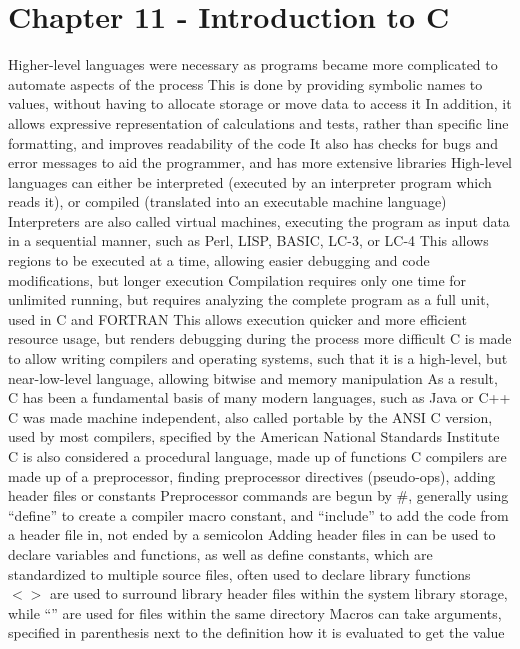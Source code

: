 \documentclass[11 pt, twoside]{article}
\newenvironment{outline*}
{
	\begin{outline}[enumerate]
	}
	{\end{outline}
}
\begin{document}
\section{Chapter 11 - Introduction to C}
\begin{outline*}
\1 Higher-level languages were necessary as programs became more complicated to automate aspects of the process
\2 This is done by providing symbolic names to values, without having to allocate storage or move data to access it
\2 In addition, it allows expressive representation of calculations and tests, rather than specific line formatting, and improves readability of the code
\2 It also has checks for bugs and error messages to aid the programmer, and has more extensive libraries
\1 High-level languages can either be interpreted (executed by an interpreter program which reads it), or compiled (translated into an executable machine language)
\2 Interpreters are also called virtual machines, executing the program as input data in a sequential manner, such as Perl, LISP, BASIC, LC-3, or LC-4
\3 This allows regions to be executed at a time, allowing easier debugging and code modifications, but longer execution
\2 Compilation requires only one time for unlimited running, but requires analyzing the complete program as a full unit, used in C and FORTRAN
\3 This allows execution quicker and more efficient resource usage, but renders debugging during the process more difficult
\1 C is made to allow writing compilers and operating systems, such that it is a high-level, but near-low-level language, allowing bitwise and memory manipulation
\2 As a result, C has been a fundamental basis of many modern languages, such as Java or C++
\2 C was made machine independent, also called portable by the ANSI C version, used by most compilers, specified by the American National Standards Institute
\2 C is also considered a procedural language, made up of functions
\1 C compilers are made up of a preprocessor, finding preprocessor directives (pseudo-ops), adding header files or constants
\2 Preprocessor commands are begun by \#, generally using ``define'' to create a compiler macro constant, and ``include'' to add the code from a header file in, not ended by a semicolon
\3 Adding header files in can be used to declare variables and functions, as well as define constants, which are standardized to multiple source files, often used to declare library functions
\3 $<>$ are used to surround library header files within the system library storage, while ``'' are used for files within the same directory
\3 Macros can take arguments, specified in parenthesis next to the definition how it is evaluated to get the value

\end{outline*}
\end{document}
